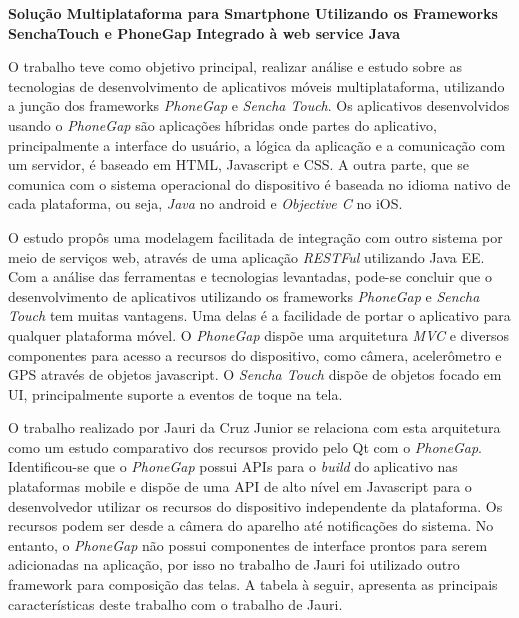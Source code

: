 \textbf{Solução Multiplataforma para Smartphone Utilizando os Frameworks SenchaTouch e PhoneGap Integrado à web service Java} \cite{jauridacruzjunior}\par
O trabalho teve como objetivo principal, realizar análise e estudo sobre as tecnologias de desenvolvimento de aplicativos móveis multiplataforma, utilizando a junção dos frameworks \textit{PhoneGap} e \textit{Sencha Touch}. Os aplicativos desenvolvidos usando o \textit{PhoneGap} são aplicações híbridas onde partes do aplicativo, principalmente a interface do usuário, a lógica da aplicação e a comunicação com um servidor, é baseado em HTML, Javascript e CSS. A outra parte, que se comunica com o sistema operacional do dispositivo é baseada no idioma nativo de cada plataforma, ou seja, \textit{Java} no android e \textit{Objective C} no iOS.\par
O estudo propôs uma modelagem facilitada de integração com outro sistema por meio de serviços web, através de uma aplicação \textit{RESTFul} utilizando Java EE. Com a análise das ferramentas e tecnologias levantadas, pode-se concluir que o desenvolvimento de aplicativos utilizando os frameworks \textit{PhoneGap} e \textit{Sencha Touch} tem muitas vantagens. Uma delas é a facilidade de portar o aplicativo para qualquer plataforma móvel. O  \textit{PhoneGap} dispõe uma arquitetura \textit{MVC} e diversos componentes para acesso a recursos do dispositivo, como câmera, acelerômetro e GPS através de objetos javascript. O \textit{Sencha Touch} dispõe de objetos focado em UI, principalmente suporte a eventos de toque na tela.\par

O trabalho realizado por Jauri da Cruz Junior se relaciona com esta arquitetura como um estudo comparativo dos recursos provido pelo Qt com o \textit{PhoneGap}. Identificou-se que o \textit{PhoneGap} possui APIs para o \textit{build} do aplicativo nas plataformas mobile e dispõe de uma API de alto nível em Javascript para o desenvolvedor utilizar os recursos do dispositivo independente da plataforma. Os recursos podem ser desde a câmera do aparelho até notificações do sistema. No entanto, o \textit{PhoneGap} não possui componentes de interface prontos para serem adicionadas na aplicação, por isso no trabalho de Jauri foi utilizado outro framework para composição das telas. A tabela à seguir, apresenta as principais características deste trabalho com o trabalho de Jauri.

